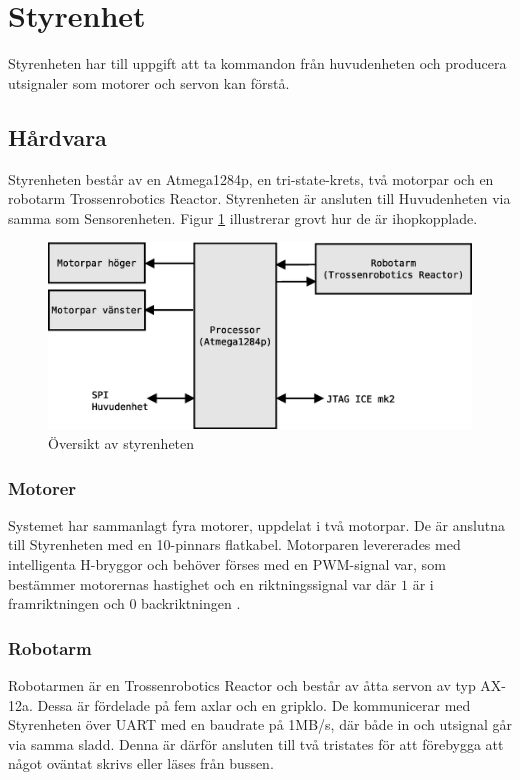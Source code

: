 
\section{Styrenhet}

Styrenheten har till uppgift att ta kommandon från huvudenheten och producera utsignaler som motorer och servon kan förstå.

\subsection{Hårdvara}
Styrenheten består av en Atmega1284p, en tri-state-krets\cite{tristate}, två motorpar och en robotarm Trossenrobotics Reactor\cite{robotarm}. Styrenheten är ansluten till Huvudenheten via samma  som Sensorenheten. Figur \ref{styr-oversikt} illustrerar grovt hur de är ihopkopplade. 

\begin{figure}[h!]
	\centering
	\includegraphics[scale=0.4]{grafik/styrenhet-oversikt}
	\caption{Översikt av styrenheten} \label{styr-oversikt}
\end{figure}

\subsubsection{Motorer}
Systemet har sammanlagt fyra motorer, uppdelat i två motorpar. De är anslutna till Styrenheten med en 10-pinnars flatkabel. Motorparen levererades med intelligenta H-bryggor\cite{pwmmotor} och behöver förses med en PWM-signal var, som bestämmer motorernas hastighet och en riktningssignal var där $1$ är i framriktningen och $0$ backriktningen .

\subsubsection{Robotarm}
Robotarmen är en Trossenrobotics Reactor och består av åtta servon av typ AX-12a\cite{servo}. Dessa är fördelade på fem axlar och en gripklo. De kommunicerar med Styrenheten över UART med en baudrate på 1MB/s, där både in och utsignal går via samma sladd. Denna är därför ansluten till två tristates för att förebygga att något oväntat skrivs eller läses från bussen.

